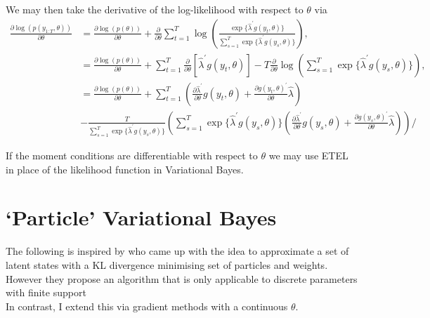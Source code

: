 \documentclass[
12pt, %
onehalfspacing, %
nohyperref, %
headsepline, %
chapterinoneline, %
]{MastersDoctoralThesis} %
\begin{document}
We may then take the derivative of the log-likelihood with respect to $\theta$ via
\begin{align}
\frac{\partial \log(p(y_{1:T}, \theta))}{\partial \theta} &= \frac{\partial \log(p(\theta))}{\partial \theta} + \frac{\partial}{\partial \theta} \sum_{t=1}^T \log \left( \frac{\exp \{\hat{\lambda}^{\prime} g(y_t, \theta) \}}{ \sum_{s=1}^T \exp \{\hat{\lambda}^{\prime} g(y_s, \theta) \}} \right), \nonumber \\
&= \frac{\partial \log(p(\theta))}{\partial \theta} + \sum_{t=1}^T \frac{\partial}{\partial \theta} \left[\hat{\lambda}^{\prime} g(y_t, \theta) \right]  - T \frac{\partial}{\partial \theta} \log \left(  \sum_{s=1}^T \exp \{\hat{\lambda}^{\prime} g(y_s, \theta) \} \right), \nonumber \\
&= \frac{\partial \log(p(\theta))}{\partial \theta} + \sum_{t=1}^T \left(\frac{\partial \hat{\lambda}^{\prime}}{\partial \theta} g(y_t, \theta) + \frac{\partial g(y_t, \theta)^{\prime}}{\partial \theta}\hat{\lambda}  \right) \nonumber \\
&- \frac{T}{\sum_{s=1}^T \exp \{\hat{\lambda}^{\prime} g(y_s, \theta) \}}\left(\sum_{s=1}^T \exp \{\hat{\lambda}^{\prime} g(y_s, \theta) \} \left(\frac{\partial \hat{\lambda}^{\prime}}{\partial \theta} g(y_s, \theta) + \frac{\partial g(y_s, \theta)^{\prime}}{\partial \theta}\hat{\lambda}  \right) \right) /
\end{align}

If the moment conditions are differentiable with respect to $\theta$ we may use ETEL in place of the likelihood function in Variational Bayes.



\section{`Particle' Variational Bayes}

The following is inspired by \cite{Saeedi2015} who came up with the idea to approximate a set of latent states with a KL divergence minimising set of particles and weights. However they propose an algorithm that is only applicable to discrete parameters with finite support
\\

In contrast, I extend this via gradient methods with a continuous $\theta$.
\\
\end{document}
